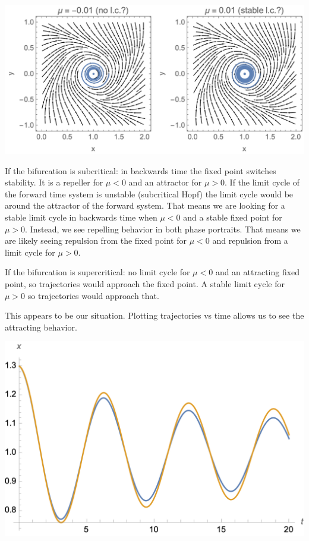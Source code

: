\documentclass[12pt,letterpaper,answers]{exam}
\begin{document}
\begin{questions}
\begin{solution}
\includegraphics[width=\textwidth]{img/PS08-S23-q1c.png}

If the bifurcation is subcritical: in backwards time the fixed point switches stability.  It is a repeller for $\mu < 0$ and an attractor for $\mu > 0$.  If the limit cycle of the forward time system is unstable (subcritical Hopf) the limit cycle would be around the attractor of the forward system.  That means we are looking for a stable limit cycle in backwards time when $\mu < 0$ and a stable fixed point for $\mu > 0$.  Instead, we see repelling behavior in both phase portraits.  That means we are likely seeing repulsion from the fixed point for $\mu < 0$ and repulsion from a limit cycle for $\mu > 0$.

If the bifurcation is supercritical: no limit cycle for $\mu < 0$ and an attracting fixed point, so trajectories would approach the fixed point.  A stable limit cycle for $\mu > 0$ so trajectories would approach that.

This appears to be our situation.  Plotting trajectories vs time allows us to see the attracting behavior.

\includegraphics{img/PS08-S23-q1d.png}


\end{solution}
\end{questions}
\end{document}
